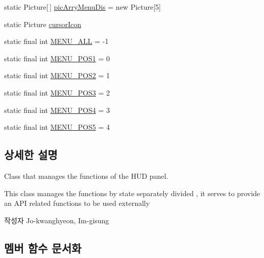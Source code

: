 \begin{DoxyCompactItemize}
static Picture\mbox{[}$\,$\mbox{]} \hyperlink{classkr_1_1ac_1_1kookmin_1_1cs_1_1hud_1_1_h_u_d_management_ab5d064aafc8e948ecd818cfec7acbb3c}{pic\+Arry\+Menu\+Dis} = new Picture\mbox{[}5\mbox{]}
\item 
static Picture \hyperlink{classkr_1_1ac_1_1kookmin_1_1cs_1_1hud_1_1_h_u_d_management_a8bd64fe62e6e91c9bd83a274eb59faa9}{cursor\+Icon}
\item 
static final int \hyperlink{classkr_1_1ac_1_1kookmin_1_1cs_1_1hud_1_1_h_u_d_management_aea6d53b87b47693e0d365f8cd6fba75f}{M\+E\+N\+U\+\_\+\+A\+L\+L} = -\/1
\item 
static final int \hyperlink{classkr_1_1ac_1_1kookmin_1_1cs_1_1hud_1_1_h_u_d_management_a3945824c1d285a532b81075debe3a8cf}{M\+E\+N\+U\+\_\+\+P\+O\+S1} = 0
\item 
static final int \hyperlink{classkr_1_1ac_1_1kookmin_1_1cs_1_1hud_1_1_h_u_d_management_a2543a9a44db444550bd334d354616928}{M\+E\+N\+U\+\_\+\+P\+O\+S2} = 1
\item 
static final int \hyperlink{classkr_1_1ac_1_1kookmin_1_1cs_1_1hud_1_1_h_u_d_management_a79ee86a5edf36a3cd5f9c9d75e40d9db}{M\+E\+N\+U\+\_\+\+P\+O\+S3} = 2
\item 
static final int \hyperlink{classkr_1_1ac_1_1kookmin_1_1cs_1_1hud_1_1_h_u_d_management_a6cae012a8c111a62d031ec590afe56bb}{M\+E\+N\+U\+\_\+\+P\+O\+S4} = 3
\item 
static final int \hyperlink{classkr_1_1ac_1_1kookmin_1_1cs_1_1hud_1_1_h_u_d_management_abfc1e4fd6ea23ecf49abfb86d47af051}{M\+E\+N\+U\+\_\+\+P\+O\+S5} = 4
\end{DoxyCompactItemize}


\subsection{상세한 설명}
Class that manages the functions of the H\+U\+D panel. 

This class manages the functions by state separately divided , it serves to provide an A\+P\+I related functions to be used externally \begin{DoxyAuthor}{작성자}
Jo-\/kwanghyeon, Im-\/gisung 
\end{DoxyAuthor}


\subsection{멤버 함수 문서화}
\hypertarget{classkr_1_1ac_1_1kookmin_1_1cs_1_1hud_1_1_h_u_d_management_a57652e0e587a00547e4664e13e87453d}{}
